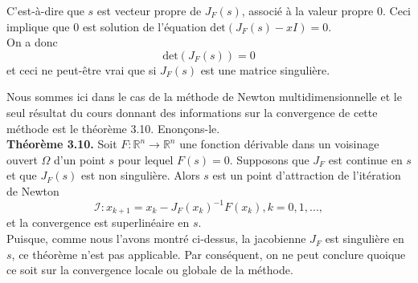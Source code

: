 C'est-à-dire que $s$ est vecteur propre de $J_F(s)$, associé à la valeur propre $0$. Ceci implique que $0$ est solution de l'équation $\text{det}(J_F(s)-xI)=0$.\\
On a donc $$\text{det}(J_F(s))=0$$ et ceci ne peut-être vrai que si $J_F(s)$ est une matrice singulière.

Nous sommes ici dans le cas de la méthode de Newton multidimensionnelle et le seul résultat du cours donnant des informations sur la convergence de cette méthode est le théorème 3.10. Enonçons-le.\\
\textbf{Théorème 3.10.} Soit $F : \mathbb{R}^n \rightarrow \mathbb{R}^n$ une fonction dérivable dans un voisinage ouvert $\Omega$ d'un point $s$ pour lequel $F(s)=0$. Supposons que $J_F$ est continue en $s$ et que $J_F(s)$ est non singulière. Alors $s$ est un point d'attraction de l'itération de Newton $$\mathcal{I} : x_{k+1} = x_k - J_F(x_k)^{-1}F(x_k), k = 0,1,...,$$ et la convergence est superlinéaire en $s$.\\
Puisque, comme nous l'avons montré ci-dessus, la jacobienne $J_F$ est singulière en $s$, ce théorème n'est pas applicable. Par conséquent, on ne peut conclure quoique ce soit sur la convergence locale ou globale de la méthode.




